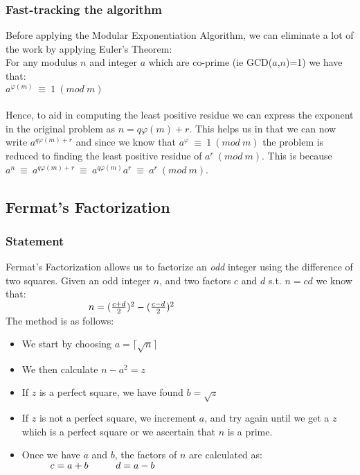 \documentclass{article}
\newcommand\tab[1][3cm]{\hspace*{#1}}
\newcommand\tabOne[1][1cm]{\hspace*{#1}}
\begin{document}
	\subsubsection{Fast-tracking the algorithm}
	Before applying the Modular Exponentiation Algorithm, we can eliminate a lot of the work by applying Euler's Theorem:\\
	For any modulus $n$ and integer $a$ which are co-prime (ie GCD($a$,$n$)=1) we have that:\\
		\tabOne $a^{\varphi(m)}~\equiv~1~(mod~m)$\\
	\\
	Hence, to aid in computing the least positive residue we can express the exponent in the original problem as $n=q\varphi(m)+r$. This helps us in that we can now write $a^{q\varphi(m)+r}$ and since we know that $a^{\varphi}~\equiv~1~(mod~m)$ the problem is reduced to finding the least positive residue of $a^r~(mod~m)$. This is because $a^n~\equiv~a^{q\varphi(m)+r}~\equiv~a^{q\varphi(m)}a^r~\equiv~a^{r}~(mod~m)$.
	
\subsection{Fermat's Factorization}
	\subsubsection{Statement}
	Fermat's Factorization allows us to factorize an \emph{odd} integer using the difference of two squares. Given an odd integer $n$, and two factors $c$ and $d$ s.t. $n=cd$ we know that:\\
		$
			\tab	n=(\frac{c+d}{2})^2-(\frac{c-d}{2})^2\\
		$\\
	The method is as follows:
		\begin{itemize}
			\item We start by choosing $a=\lceil\sqrt{n}\rceil$
			\item We then calculate $n-a^2=z$
			\item If $z$ is a perfect square, we have found $b=\sqrt{z}$
			\item If $z$ is not a perfect square, we increment $a$, and try again until we get a $z$ which is a perfect square or we ascertain that $n$ is a prime.
			\item Once we have $a$ and $b$, the factors of $n$ are calculated as:\\
					$
						\tabOne c=a+b\\
						\tabOne d=a-b\\
					$\\
		\end{itemize}
\end{document}

